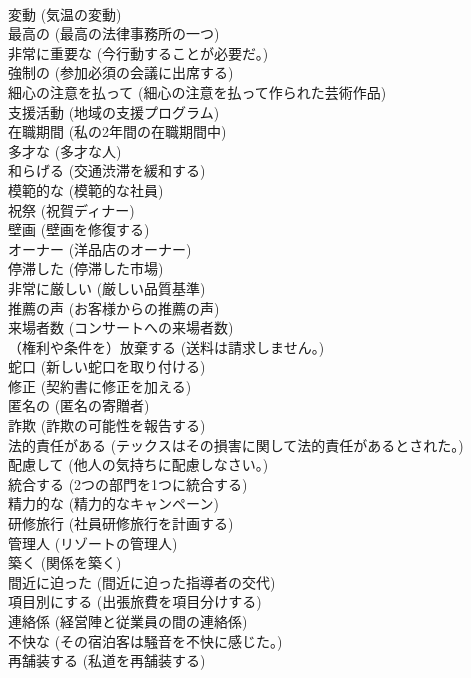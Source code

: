 \documentclass[8pt]{extreport}
\begin{document}
\begin{CJK}{UTF8}{min}
\\	変動	(気温の変動)		
\\	最高の	(最高の法律事務所の一つ)		
\\	非常に重要な	(今行動することが必要だ。)		
\\	強制の	(参加必須の会議に出席する)		
\\	細心の注意を払って	(細心の注意を払って作られた芸術作品)		
\\	支援活動	(地域の支援プログラム)		
\\	在職期間	(私の2年間の在職期間中)		
\\	多才な	(多才な人)		
\\	和らげる	(交通渋滞を緩和する)		
\\	模範的な	(模範的な社員)		
\\	祝祭	(祝賀ディナー)		
\\	壁画	(壁画を修復する)		
\\	オーナー	(洋品店のオーナー)		
\\	停滞した	(停滞した市場)		
\\	非常に厳しい	(厳しい品質基準)		
\\	推薦の声	(お客様からの推薦の声)		
\\	来場者数	(コンサートへの来場者数)		
\\	（権利や条件を）放棄する	(送料は請求しません。)		
\\	蛇口	(新しい蛇口を取り付ける)		
\\	修正	(契約書に修正を加える)		
\\	匿名の	(匿名の寄贈者)		
\\	詐欺	(詐欺の可能性を報告する)		
\\	法的責任がある	(テックスはその損害に関して法的責任があるとされた。)		
\\	配慮して	(他人の気持ちに配慮しなさい。)		
\\	統合する	(2つの部門を1つに統合する)		
\\	精力的な	(精力的なキャンペーン)		
\\	研修旅行	(社員研修旅行を計画する)		
\\	管理人	(リゾートの管理人)		
\\	築く	(関係を築く)		
\\	間近に迫った	(間近に迫った指導者の交代)		
\\	項目別にする	(出張旅費を項目分けする)		
\\	連絡係	(経営陣と従業員の間の連絡係)		
\\	不快な	(その宿泊客は騒音を不快に感じた。)		
\\	再舗装する	(私道を再舗装する)		

\end{CJK}
\end{document}

